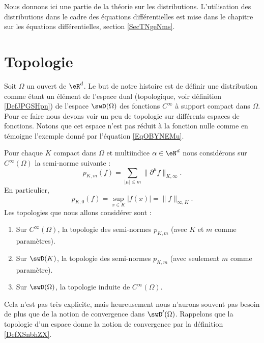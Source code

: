 
Nous donnons ici une partie de la théorie sur les distributions. L'utilisation des distributions dans le cadre des équations différentielles est mise dans le chapitre sur les équations différentielles, section \ref{SecTNgeNms}.

\section{Topologie}

Soit \( \Omega\) un ouvert de \( \eR^d\). Le but de notre histoire est de définir une distribution comme étant un élément de l'espace dual (topologique, voir définition \ref{DefJPGSHpn}) de l'espace \( \swD(\Omega)\) des fonctions \( C^{\infty}\) à support compact dans \( \Omega\). Pour ce faire nous devons voir un peu de topologie sur différents espaces de fonctions. Notons que cet espace n'est pas réduit à la fonction nulle comme en témoigne l'exemple donné par l'équation \eqref{EqOBYNEMu}.

Pour chaque \( K\) compact dans \( \Omega\) et multiindice \( \alpha\in \eN^d\) nous considérons sur \(  C^{\infty}(\Omega)\) la semi-norme suivante :
\begin{equation}
    p_{K,m}(f)=\sum_{| \mu |\leq m}\| \partial^{\mu}f \|_{K,\infty}.
\end{equation}
En particulier,
\begin{equation}
    p_{K,0}(f)=\sup_{x\in K}| f(x) |=\| f \|_{\infty,K}.
\end{equation}
Les topologies que nous allons considérer sont :
\begin{enumerate}
    \item
        Sur \(  C^{\infty}(\Omega)\), la topologie des semi-normes \( p_{K,m}\) (avec \( K\) et \( m\) comme paramètres).
    \item
        Sur \( \swD(K)\), la topologie des semi-normes \( p_{K,m}\) (avec seulement \( m\) comme paramètre).
    \item
        Sur \( \swD(\Omega)\), la topologie induite de \(  C^{\infty}(\Omega)\).
\end{enumerate}
Cela n'est pas très explicite, mais heureusement nous n'aurons souvent pas besoin de plus que de la notion de convergence dans \( \swD'(\Omega)\). Rappelons que la topologie d'un espace donne la notion de convergence par la définition \ref{DefXSnbhZX}.

